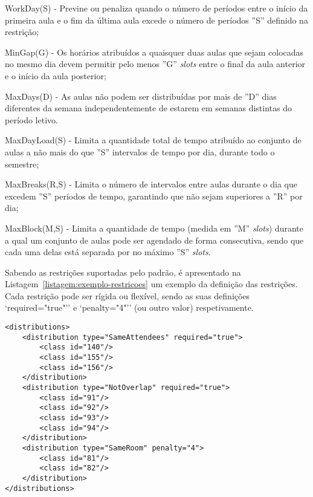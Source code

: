 \begin{compactitem}
    \item WorkDay(S) - Previne ou penaliza quando o número de períodos entre o início da primeira aula e o fim da última aula excede o número de períodos ''S'' definido na restrição;

    \item MinGap(G) - Os horários atribuídos a quaisquer duas aulas que sejam colocadas no mesmo dia devem permitir pelo menos ''G'' \textit{slots} entre o final da aula anterior e o início da aula posterior;

    \item MaxDays(D) - As aulas não podem ser distribuídas por mais de ''D'' dias diferentes da semana independentemente de estarem em semanas distintas do período letivo.

    \item MaxDayLoad(S) - Limita a quantidade total de tempo atribuído ao conjunto de aulas a não mais do que ''S'' intervalos de tempo por dia, durante todo o semestre;

    \item MaxBreaks(R,S) - Limita o número de intervalos entre aulas durante o dia que excedem ''S'' períodos de tempo, garantindo que não sejam superiores a ''R'' por dia;

    \item MaxBlock(M,S) - Limita a quantidade de tempo (medida em ''M'' \textit{slots}) durante a qual um conjunto de aulas pode ser agendado de forma consecutiva, sendo que cada uma delas está separada por no máximo ''S'' \textit{slots}.
\end{compactitem}

Sabendo as restrições suportadas pelo padrão, é apresentado na Listagem~\ref{listagem:exemplo-restricoes} um exemplo da definição das restrições. Cada restrição pode ser rígida ou flexível, sendo as suas definições `required="true"'' e `penalty="4"'' (ou outro valor) respetivamente.

\begin{minipage}[c]{\linewidth}
\begin{lstlisting}[caption={Exemplo da definição das restrições.}, label={listagem:exemplo-restricoes}]
<distributions>
    <distribution type="SameAttendees" required="true">
        <class id="140"/>
        <class id="155"/>
        <class id="156"/>
    </distribution>
    <distribution type="NotOverlap" required="true">
        <class id="91"/>
        <class id="92"/>
        <class id="93"/>
        <class id="94"/>
    </distribution>
    <distribution type="SameRoom" penalty="4">
        <class id="81"/>
        <class id="82"/>
    </distribution>
</distributions>
\end{lstlisting}
\end{minipage}

